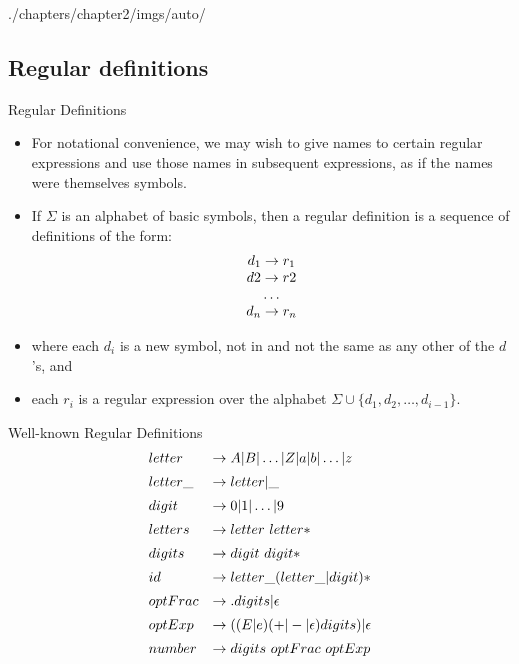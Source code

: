\begin{graphicspathcontext}{{./chapters/chapter2/imgs/auto/}}
\begin{bibunit}[apalike]
\subsection{Regular definitions}

\tableofcontentslide[sections={1-5},sectionstyle={show/shaded},subsectionstyle={show/shaded/hide},subsubsectionstyle={hide/hide/hide/hide}]

\begin{frame}{Regular Definitions}
	\begin{itemize}
	\item For notational convenience, we may wish to give names to certain regular expressions and use those names in subsequent expressions, as if the names were themselves symbols.
	\item If $\Sigma$ is an alphabet of basic symbols, then a regular definition is a sequence of definitions of the form:
		\[\begin{array}{@{}c@{}}
			d_1 \rightarrow r_1 \\
			d2 \rightarrow r2 \\
			\dots \\
			d_n \rightarrow r_n
		\end{array}\]
	\item where each $d_i$ is a new symbol, not in and not the same as any other of the $d$'s, and
	\item each $r_i$ is a regular expression over the alphabet $\Sigma\cup\{d_1,d_2,\dots,d_{i-1}\}$.
	\end{itemize}
\end{frame}

\begin{frame}{Well-known Regular Definitions}
	\[\begin{array}{@{}ll@{}}
		letter & \rightarrow A | B | \dots | Z | a | b | \dots | z \\[.5em]
		letter\_ & \rightarrow letter | \_ \\[.5em]
		digit & \rightarrow 0 | 1 | \dots | 9 \\[.5em]
		letters & \rightarrow letter\ letter* \\[.5em]
		digits & \rightarrow digit\ digit* \\[.5em]
		id & \rightarrow letter\_ ( letter\_ | digit )* \\[.5em]
		optFrac & \rightarrow . digits | \epsilon \\[.5em]
		optExp & \rightarrow ( (E|e) (+|-|\epsilon) digits ) | \epsilon \\[.5em]
		number & \rightarrow digits\ optFrac\ optExp
	\end{array}\]
\end{frame}


\end{bibunit}
\end{graphicspathcontext}
